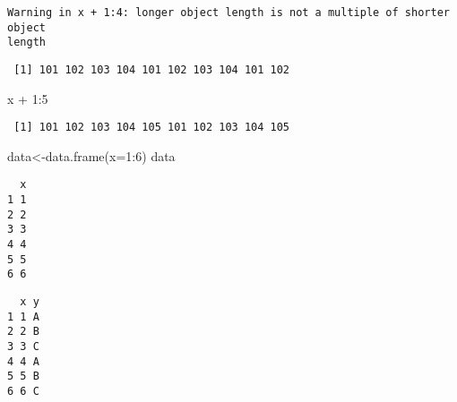 \documentclass[
  letterpaper,
  DIV=11,
  numbers=noendperiod]{scrreprt}
\newenvironment{Shaded}{\begin{snugshade}}{\end{snugshade}}
\newcommand{\AttributeTok}[1]{\textcolor[rgb]{0.40,0.45,0.13}{#1}}
\newcommand{\CommentTok}[1]{\textcolor[rgb]{0.37,0.37,0.37}{#1}}
\newcommand{\DecValTok}[1]{\textcolor[rgb]{0.68,0.00,0.00}{#1}}
\newcommand{\FunctionTok}[1]{\textcolor[rgb]{0.28,0.35,0.67}{#1}}
\newcommand{\NormalTok}[1]{\textcolor[rgb]{0.00,0.23,0.31}{#1}}
\newcommand{\OtherTok}[1]{\textcolor[rgb]{0.00,0.23,0.31}{#1}}
\newcommand{\SpecialCharTok}[1]{\textcolor[rgb]{0.37,0.37,0.37}{#1}}
\newcommand{\StringTok}[1]{\textcolor[rgb]{0.13,0.47,0.30}{#1}}
\begin{document}
\begin{verbatim}
Warning in x + 1:4: longer object length is not a multiple of shorter object
length
\end{verbatim}

\begin{verbatim}
 [1] 101 102 103 104 101 102 103 104 101 102
\end{verbatim}

\begin{Shaded}
\begin{Highlighting}[]
\NormalTok{x }\SpecialCharTok{+} \DecValTok{1}\SpecialCharTok{:}\DecValTok{5}
\end{Highlighting}
\end{Shaded}

\begin{verbatim}
 [1] 101 102 103 104 105 101 102 103 104 105
\end{verbatim}

\begin{Shaded}
\begin{Highlighting}[]
\NormalTok{data}\OtherTok{\textless{}{-}}\FunctionTok{data.frame}\NormalTok{(}\AttributeTok{x=}\DecValTok{1}\SpecialCharTok{:}\DecValTok{6}\NormalTok{)}
\NormalTok{data}
\end{Highlighting}
\end{Shaded}

\begin{verbatim}
  x
1 1
2 2
3 3
4 4
5 5
6 6
\end{verbatim}

\begin{Shaded}
\end{Shaded}

\begin{verbatim}
  x y
1 1 A
2 2 B
3 3 C
4 4 A
5 5 B
6 6 C
\end{verbatim}

\begin{Shaded}
\end{Shaded}
\end{document}

